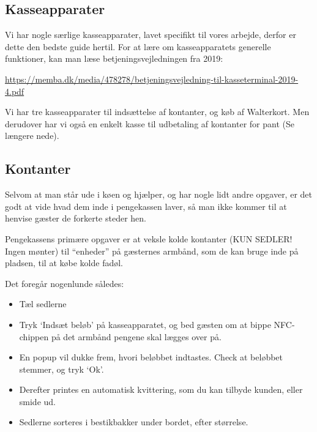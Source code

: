 \subsection{Kasseapparater}
Vi har nogle særlige kasseapparater, lavet specifikt til vores arbejde, derfor er dette den bedste guide hertil. 
For at lære om kasseapparatets generelle funktioner, kan man læse betjeningsvejledningen fra 2019:
\begin{center}
  \small
  \href{https://memba.dk/media/478278/betjeningsvejledning-til-kasseterminal-2019-4.pdf}{https://memba.dk/media/478278/betjeningsvejledning-til-kasseterminal-2019-4.pdf}
\end{center}

Vi har tre kasseapparater til indsættelse af kontanter, og køb af Walterkort. Men derudover har vi også en 
enkelt kasse til udbetaling af kontanter for pant (Se længere nede).

\subsection{Kontanter}

Selvom at man står ude i køen og hjælper, og har nogle lidt andre opgaver, 
er det godt at vide hvad dem inde i pengekassen laver, 
så man ikke kommer til at henvise gæster de forkerte steder hen.

Pengekassens primære opgaver er at veksle kolde kontanter (KUN SEDLER! Ingen mønter) til ``enheder'' på gæsternes armbånd, 
som de kan bruge inde på pladsen, til at købe kolde fadøl.

Det foregår nogenlunde således:
\begin{itemize}
  \item Tæl sedlerne
  \item Tryk `Indsæt beløb' på kasseapparatet, og bed gæsten om at bippe NFC-chippen på det armbånd pengene 
  skal lægges over på.
  \item En popup vil dukke frem, hvori beløbbet indtastes. 
  Check at beløbbet stemmer, og tryk `Ok'.
  \item Derefter printes en automatisk kvittering, som du kan tilbyde kunden, eller smide ud.
  \item Sedlerne sorteres i bestikbakker under bordet, efter størrelse.
\end{itemize}

